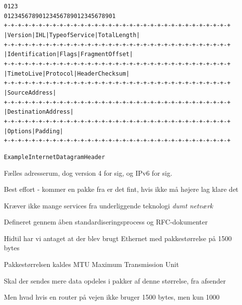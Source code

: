 \documentclass[Screen16to9,17pt]{foils}
\begin{document}

\begin{alltt}
\small
    0                   1                   2                   3
    0 1 2 3 4 5 6 7 8 9 0 1 2 3 4 5 6 7 8 9 0 1 2 3 4 5 6 7 8 9 0 1
   +-+-+-+-+-+-+-+-+-+-+-+-+-+-+-+-+-+-+-+-+-+-+-+-+-+-+-+-+-+-+-+-+
   |Version|  IHL  |Type of Service|          Total Length         |
   +-+-+-+-+-+-+-+-+-+-+-+-+-+-+-+-+-+-+-+-+-+-+-+-+-+-+-+-+-+-+-+-+
   |         Identification        |Flags|      Fragment Offset    |
   +-+-+-+-+-+-+-+-+-+-+-+-+-+-+-+-+-+-+-+-+-+-+-+-+-+-+-+-+-+-+-+-+
   |  Time to Live |    Protocol   |         Header Checksum       |
   +-+-+-+-+-+-+-+-+-+-+-+-+-+-+-+-+-+-+-+-+-+-+-+-+-+-+-+-+-+-+-+-+
   |                       Source Address                          |
   +-+-+-+-+-+-+-+-+-+-+-+-+-+-+-+-+-+-+-+-+-+-+-+-+-+-+-+-+-+-+-+-+
   |                    Destination Address                        |
   +-+-+-+-+-+-+-+-+-+-+-+-+-+-+-+-+-+-+-+-+-+-+-+-+-+-+-+-+-+-+-+-+
   |                    Options                    |    Padding    |
   +-+-+-+-+-+-+-+-+-+-+-+-+-+-+-+-+-+-+-+-+-+-+-+-+-+-+-+-+-+-+-+-+

                    Example Internet Datagram Header
\end{alltt}


\begin{list1}
\item Fælles adresserum, dog version 4 for sig, og IPv6 for sig.
\item Best effort - kommer en pakke fra er det fint, hvis ikke må højere lag klare det
\item Kræver ikke mange services fra underliggende teknologi \emph{dumt netværk}
\item Defineret gennem åben standardiseringsprocess og RFC-dokumenter
\end{list1}


\begin{list1}
\item Hidtil har vi antaget at der blev brugt Ethernet med pakkestørrelse på 1500 bytes
\item Pakkestørrelsen kaldes MTU Maximum Transmission Unit
\item Skal der sendes mere data opdeles i pakker af denne størrelse, fra afsender
\item Men hvad hvis en router på vejen ikke bruger 1500 bytes, men kun 1000
\end{list1}
\end{document}
